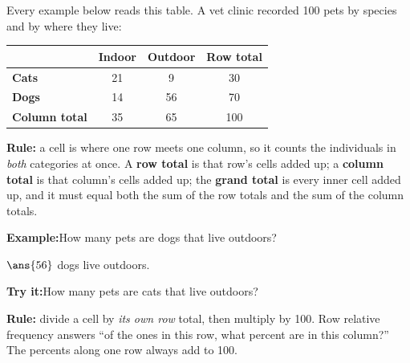 \documentclass[12pt]{article}
\begin{document}

\noindent\small Every example below reads this table. A vet clinic recorded
100 pets by species and by where they live:\normalsize
\par\smallskip
\begin{center}
\renewcommand{\arraystretch}{1.2}
\begin{tabular}{|l|c|c|c|}
\hline
 & \textbf{Indoor} & \textbf{Outdoor} & \textbf{Row total} \\
\hline
\textbf{Cats} & 21 & 9 & 30 \\
\hline
\textbf{Dogs} & 14 & 56 & 70 \\
\hline
\textbf{Column total} & 35 & 65 & 100 \\
\hline
\end{tabular}
\end{center}


\begin{formulabox}
\textbf{Rule:} a cell is where one row meets one column, so it counts the
individuals in \emph{both} categories at once. A \textbf{row total} is that
row's cells added up; a \textbf{column total} is that column's cells added up;
the \textbf{grand total} is every inner cell added up, and it must equal both
the sum of the row totals and the sum of the column totals.
\end{formulabox}

\begin{examplebox}
\textbf{Example:}\quad How many pets are dogs that live outdoors?

$\ans{56}$ dogs live outdoors.
\end{examplebox}

\begin{tryitbox}
\textbf{Try it:}\quad How many pets are cats that live outdoors?\\[2pt]
\end{tryitbox}


\begin{formulabox}
\textbf{Rule:} divide a cell by \emph{its own row} total, then multiply by 100.
Row relative frequency answers ``of the ones in this row, what percent are in
this column?'' The percents along one row always add to 100.
\end{formulabox}
\end{document}
